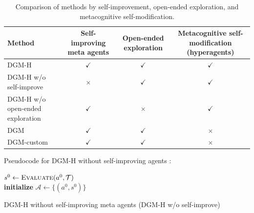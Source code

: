 \begin{table}[H]
\centering
\begin{adjustbox}{width=\textwidth}
\begin{tabular}{@{}lccc@{}}
\toprule
Method & Self-improving meta agents & Open-ended exploration & Metacognitive self-modification (hyperagents) \\
\midrule
DGM-H                            & $\checkmark$ & $\checkmark$ & $\checkmark$ \\
DGM-H w/o self-improve           & $\times$     & $\checkmark$ & $\checkmark$ \\
DGM-H w/o open-ended exploration & $\checkmark$ & $\times$     & $\checkmark$ \\
DGM                              & $\checkmark$ & $\checkmark$ & $\times$     \\
DGM-custom                       & $\checkmark$ & $\checkmark$ & $\times$     \\
\bottomrule
\end{tabular}
\end{adjustbox}
\caption[Comparison of methods by self-improvement, open-ended exploration, and metacognitive self-modification]{Comparison of methods by self-improvement, open-ended exploration, and metacognitive self-modification.}
\label{tab:method-comparison}
\end{table}

Pseudocode for DGM-H without self-improving agents \citep[ADAS,][]{huautomated}:

\begin{algorithm}[H]
\DontPrintSemicolon
\SetAlgoLined
{}
\BlankLine
$s^{0} \leftarrow \textsc{Evaluate}(a^{0}, \mathcal{T})$ \\
\textbf{initialize} $\mathcal{A} \leftarrow \{(a^{0}, s^{0})\}$ \\
\caption{DGM-H without self-improving meta agents (DGM-H w/o self-improve)}
\label{algo:DGM-H-wo-selfimprove}
\end{algorithm}

